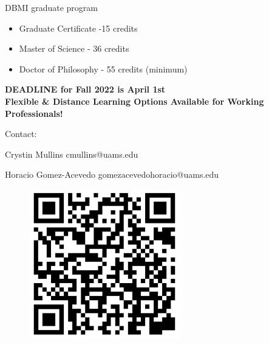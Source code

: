 \documentclass{beamer}
\begin{document}
	\begin{frame}{DBMI graduate program}
		
		\begin{itemize}
			\item Graduate Certificate -15 credits
			\item Master of Science - 36 credits
			\item Doctor of Philosophy - 55 credits (minimum)
		\end{itemize}
		
		
		\begin{center}
			\textbf{ DEADLINE  for Fall 2022  is April 1st} \\
			\textbf{Flexible \& Distance Learning Options Available for Working Professionals!}

		\end{center}
		Contact:
		
		
		Crystin Mullins cmullins@uams.edu
		
		Horacio Gomez-Acevedo gomezacevedohoracio@uams.edu
		
				\begin{figure}[h]
			\centering
			\includegraphics[scale=0.45]{Figures/qr_code_new.png}
		\end{figure}
		
	\end{frame}
	
\end{document}
